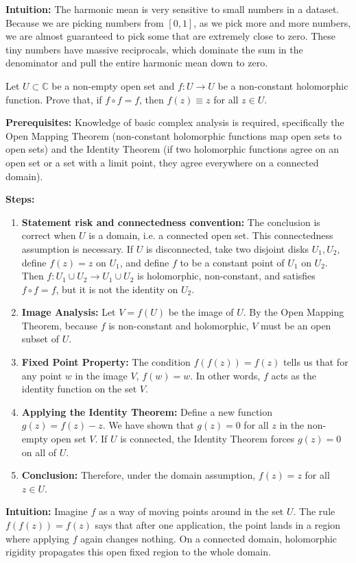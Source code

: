 \begin{solution}
\textbf{Intuition:}
The harmonic mean is very sensitive to small numbers in a dataset. Because we are picking numbers from $[0,1]$, as we pick more and more numbers, we are almost guaranteed to pick some that are extremely close to zero. These tiny numbers have massive reciprocals, which dominate the sum in the denominator and pull the entire harmonic mean down to zero.
\end{solution}

\begin{exercise}
\label{analysis:2022:2}
Let $U\subset\mathbb{C}$ be a non-empty open set and $f:U\to U$ be a non-constant holomorphic function. Prove that, if $f\circ f = f$, then $f(z)\equiv z$ for all $z\in U$.
\end{exercise}

\begin{solution}
\textbf{Prerequisites:}
Knowledge of basic complex analysis is required, specifically the Open Mapping Theorem (non-constant holomorphic functions map open sets to open sets) and the Identity Theorem (if two holomorphic functions agree on an open set or a set with a limit point, they agree everywhere on a connected domain).


\textbf{Steps:}
\begin{enumerate}
    \item \textbf{Statement risk and connectedness convention:} The conclusion is correct when $U$ is a domain, i.e. a connected open set. This connectedness assumption is necessary. If $U$ is disconnected, take two disjoint disks $U_1,U_2$, define $f(z)=z$ on $U_1$, and define $f$ to be a constant point of $U_1$ on $U_2$. Then $f:U_1\cup U_2\to U_1\cup U_2$ is holomorphic, non-constant, and satisfies $f\circ f=f$, but it is not the identity on $U_2$.

    \item \textbf{Image Analysis:} Let $V = f(U)$ be the image of $U$. By the Open Mapping Theorem, because $f$ is non-constant and holomorphic, $V$ must be an open subset of $U$.

    \item \textbf{Fixed Point Property:} The condition $f(f(z)) = f(z)$ tells us that for any point $w$ in the image $V$, $f(w) = w$. In other words, $f$ acts as the identity function on the set $V$.

    \item \textbf{Applying the Identity Theorem:} Define a new function $g(z) = f(z) - z$. We have shown that $g(z) = 0$ for all $z$ in the non-empty open set $V$. If $U$ is connected, the Identity Theorem forces $g(z)=0$ on all of $U$.

    \item \textbf{Conclusion:} Therefore, under the domain assumption, $f(z)=z$ for all $z\in U$.
\end{enumerate}


\textbf{Intuition:}
Imagine $f$ as a way of moving points around in the set $U$. The rule $f(f(z)) = f(z)$ says that after one application, the point lands in a region where applying $f$ again changes nothing. On a connected domain, holomorphic rigidity propagates this open fixed region to the whole domain.
\end{solution}

